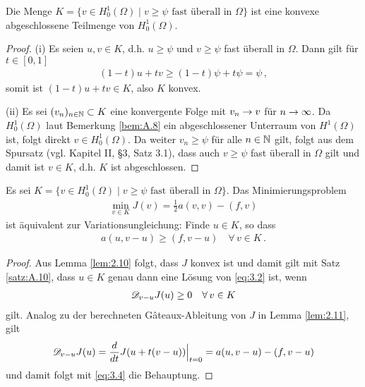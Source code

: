 \begin{lemma}\label{lem:3.1}
Die Menge $K =  \{v \in H^1_0(\Omega) \mid v\ge \psi\text{ fast überall in }\Omega\}$ ist eine konvexe abgeschlossene Teilmenge von $H^1_0(\Omega)$.
\end{lemma}

\begin{proof}
(i) Es seien $u,v \in K$, d.h. $u \ge \psi$ und $v \ge \psi$ fast überall in $\Omega$. Dann gilt für $t \in [0,1]$
\begin{align*}
	(1-t) u + tv \ge (1-t)\psi + t \psi = \psi  \, ,
\end{align*}
somit ist $(1-t)u + tv \in K$, also $K$ konvex.

(ii) Es sei $(v_n)_{n\in \mathbb{N}}\subset K$ eine konvergente Folge mit $v_n \rightarrow v$ für $n\rightarrow \infty$. Da $H^1_0(\Omega)$ laut Bemerkung \ref{bem:A.8} ein abgeschlossener Unterraum von $H^1(\Omega)$ ist, folgt direkt $v \in H^1_0(\Omega)$. Da weiter $v_n \ge \psi$ für alle $n \in \mathbb{N}$ gilt, folgt aus dem Spursatz (vgl. \cite{BraeFEM} Kapitel II, \S3, Satz 3.1), dass auch $v \ge \psi$ fast überall in $\Omega$ gilt und damit ist $v \in K$, d.h. $K$ ist abgeschlossen.
\end{proof}


\begin{satz}\label{satz:3.2}
Es sei $K =   \{v \in H^1_0(\Omega) \mid v\ge \psi\text{ fast überall in }\Omega\}$. Das Minimierungsproblem
\begin{align}\label{eq:3.2}
	\min_{v\in K} J(v) = \frac 1 2 a(v,v)-(f,v)
\end{align}
ist äquivalent zur Variationsungleichung: Finde $u \in K$, so dass
\begin{align}\label{eq:3.3}
	a(u,v-u) \ge (f,v-u) \quad \forall \, v \in K \, .
\end{align}
\end{satz}

\begin{proof}
Aus Lemma \ref{lem:2.10} folgt, dass $J$ konvex ist und damit gilt mit Satz \ref{satz:A.10}, dass $u \in K$ genau dann eine Lösung von \eqref{eq:3.2} ist, wenn
\begin{align}\label{eq:3.4}
	\mathscr D_{v-u} J(u) \ge 0 \quad \forall \, v \in K 
\end{align}
gilt. Analog zu der berechneten Gâteaux-Ableitung von $J$ in Lemma \ref{lem:2.11}, gilt
\[
	\mathscr D_{v-u} J(u) = \frac d{dt} J(u+t(v-u))\Big|_{t=0} = a(u,v-u) -(f,v-u)
\]
und damit folgt mit \eqref{eq:3.4} die Behauptung.
\end{proof}


